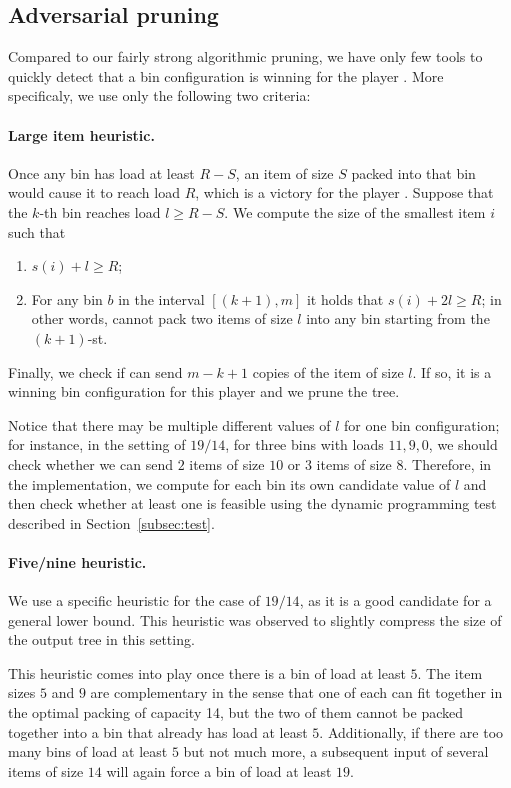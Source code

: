 \subsection{Adversarial pruning}\label{sec:4:advpruning}

Compared to our fairly strong algorithmic pruning, we have only few
tools to quickly detect that a bin configuration is winning for the
player \adversary. More specificaly, we use only the following two
criteria:

\paragraph{Large item heuristic.} Once any bin has load at least $R-S$,
an item of size $S$ packed into that bin would cause it to reach load
$R$, which is a victory for the player \adversary. Suppose that the
$k$-th bin reaches load $l \ge R-S$. We compute the size of the
smallest item $i$ such that

\begin{enumerate}
\item $s(i) + l \ge R$;
\item For any bin $b$ in the interval $[(k+1), m]$ it holds
that $s(i) + 2l \ge R$; in other words, \algo cannot pack
two items of size $l$ into any bin starting from the $(k+1)$-st.
\end{enumerate}

Finally, we check if \adversary can send $m-k+1$ copies of the item of
size $l$. If so, it is a winning bin configuration for this player and
we prune the tree.

Notice that there may be multiple different values of $l$ for one bin
configuration; for instance, in the setting of $19/14$, for three bins
with loads $11,9,0$, we should check whether we can send $2$ items of
size $10$ or $3$ items of size $8$. Therefore, in the implementation,
we compute for each bin its own candidate value of $l$ and then check
whether at least one is feasible using the dynamic programming test
described in Section~\ref{subsec:test}.

\paragraph{Five/nine heuristic.} We use a specific heuristic for the
case of $19/14$, as it is a good candidate for a general lower
bound. This heuristic was observed to slightly compress the size of
the output tree in this setting.

This heuristic comes into play once there is a bin of load at least
$5$. The item sizes $5$ and $9$ are complementary in the sense that
one of each can fit together in the optimal packing of capacity 14,
but the two of them cannot be packed together into a bin that already
has load at least $5$. Additionally, if there are too many bins of
load at least $5$ but not much more, a subsequent input of several
items of size $14$ will again force a bin of load at least $19$.

